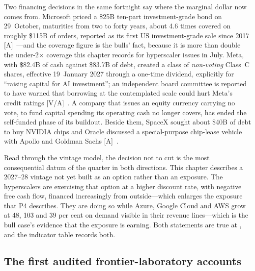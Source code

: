 Two financing decisions in the same fortnight say where the marginal dollar now comes from. Microsoft priced a \$25B ten-part investment-grade bond on 29~October, maturities from two to forty years, about 4.6 times covered on roughly \$115B of orders, reported as its first US investment-grade sale since 2017 [A]~\cite{cap-msft-fq1}---and the coverage figure is the bulls' fact, because it is more than double the under-2$\times$ coverage this chapter records for hyperscaler issues in July. Meta, with \$82.4B of cash against \$83.7B of debt, created a class of \emph{non-voting} Class~C shares, effective 19~January 2027 through a one-time dividend, explicitly for ``raising capital for AI investment''; an independent board committee is reported to have warned that borrowing at the contemplated scale could hurt Meta's credit ratings [V/A]~\cite{cap-meta-q3}. A company that issues an equity currency carrying no vote, to fund capital spending its operating cash no longer covers, has ended the self-funded phase of its buildout. Beside them, SpaceX sought about \$40B of debt to buy NVIDIA chips and Oracle discussed a special-purpose chip-lease vehicle with Apollo and Goldman Sachs [A]~\cite{cap-broadcom-openai-debt,cap-spacex-debt}.

Read through the vintage model, the decision not to cut is the most consequential datum of the quarter in both directions. This chapter describes a 2027--28 vintage not yet built as an option rather than an exposure. The hyperscalers are exercising that option at a higher discount rate, with negative free cash flow, financed increasingly from outside---which enlarges the exposure that P4 describes. They are doing so while Azure, Google Cloud and AWS grow at 48, 103 and 39 per cent on demand visible in their revenue lines---which is the bull case's evidence that the exposure is earning. Both statements are true at \datafreeze, and the indicator table records both.

\subsection{The first audited frontier-laboratory accounts}
\label{sec:cap-s1}

